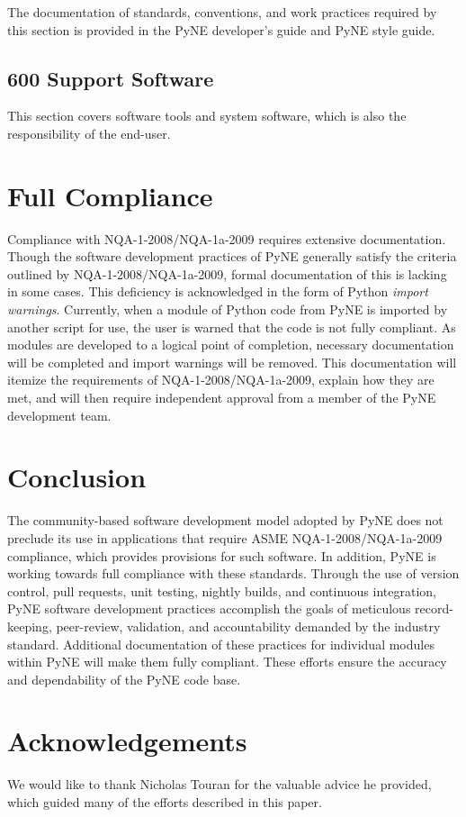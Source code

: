 \documentclass{anstrans}
\begin{document}
The documentation of standards, conventions, and work practices required by
this section is provided in the PyNE developer's guide and PyNE style guide.

\subsection{600 Support Software}
This section covers software tools and system software, which is also the responsibility of the end-user.

\section{Full Compliance}

Compliance with NQA-1-2008/NQA-1a-2009 requires extensive documentation.
Though the software development practices of PyNE generally satisfy the
criteria outlined by NQA-1-2008/NQA-1a-2009, formal documentation of this is
lacking in some cases. This deficiency is acknowledged in the form of Python \emph{import
warnings}. Currently, when a module of Python code from PyNE is imported by
another script for use, the user is warned that the code is not fully
compliant. As modules are developed to a logical point of completion, necessary
documentation will be completed and import warnings will be removed. 
This documentation will itemize the requirements of NQA-1-2008/NQA-1a-2009,
explain how they are met, and will then require independent approval from a
member of the PyNE development team.

\section{Conclusion}

The community-based software development model adopted by PyNE does not
preclude its use in applications that require ASME NQA-1-2008/NQA-1a-2009
compliance, which provides provisions for such software. In addition, PyNE is working towards full compliance with these standards.
Through the use of version control, pull requests, unit testing, nightly builds, and
continuous integration, PyNE software development practices accomplish the
goals of meticulous record-keeping, peer-review, validation, and accountability
demanded by the industry standard. Additional documentation of these practices for
individual modules within PyNE will make them fully compliant. These efforts ensure the accuracy and
dependability of the PyNE code base.

\section{Acknowledgements}

We would like to thank Nicholas Touran for the valuable advice he provided, which
guided many of the efforts described in this paper.



\end{document}
